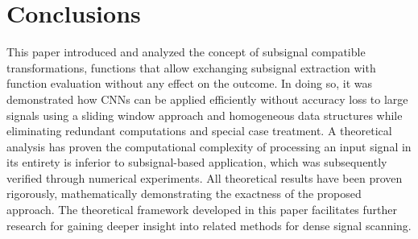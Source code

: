\documentclass[journal]{IEEEtran}
\begin{document}
\section{Conclusions}
\label{sect:conclusions}
This paper introduced and analyzed the concept of subsignal compatible transformations, functions that allow exchanging subsignal extraction with function evaluation without any effect on the outcome.
In doing so, it was demonstrated how CNNs can be applied efficiently without accuracy loss to large signals using a sliding window approach and homogeneous data structures while eliminating redundant computations and special case treatment.
A theoretical analysis has proven the computational complexity of processing an input signal in its entirety is inferior to subsignal-based application, which was subsequently verified through numerical experiments.
All theoretical results have been proven rigorously, mathematically demonstrating the exactness of the proposed approach.
The theoretical framework developed in this paper facilitates further research for gaining deeper insight into related methods for dense signal scanning.



\end{document}
